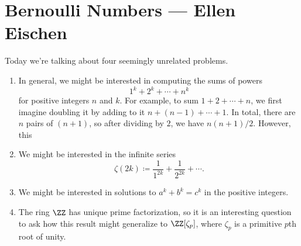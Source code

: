 \documentclass{article}
\begin{document}
\section{Bernoulli Numbers --- Ellen Eischen}
Today we're talking about four seemingly unrelated problems.
\begin{enumerate}
	\item In general, we might be interested in computing the sums of powers
	\[1^k+2^k+\cdots+n^k\]
	for positive integers $n$ and $k$. For example, to sum $1+2+\cdots+n$, we first imagine doubling it by adding to it $n+(n-1)+\cdots+1$. In total, there are $n$ pairs of $(n+1)$, so after dividing by $2$, we have $n(n+1)/2$. However, this 
	\item We might be interested in the infinite series
	\[\zeta(2k)\coloneqq\frac1{1^{2k}}+\frac1{2^{2k}}+\cdots.\]
	\item We might be interested in solutions to $a^k+b^k=c^k$ in the positive integers.
	\item The ring $\ZZ$ has unique prime factorization, so it is an interesting question to ask how this result might generalize to $\ZZ[\zeta_p]$, where $\zeta_p$ is a primitive $p$th root of unity.
\end{enumerate}
\end{document}
